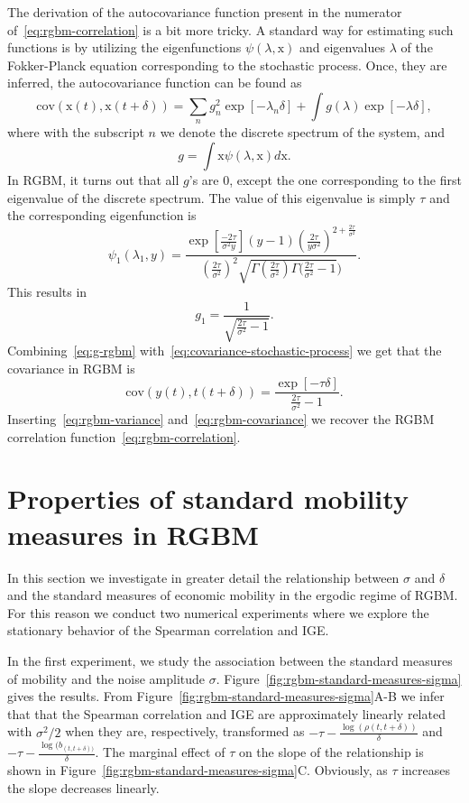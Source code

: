 \documentclass[11pt]{article}
\newcommand{\Fref}[1]{Figure~\ref{fig:#1}}
\newcommand{\be}{\begin{equation}}
\newcommand{\ee}{\end{equation}}
\numberwithin{equation}{section}
\begin{document}
The derivation of the autocovariance function present in the numerator of~\eqref{eq:rgbm-correlation} is a bit more tricky. A standard way for estimating such functions is by utilizing the eigenfunctions $\psi(\lambda,\mathrm{x})$ and eigenvalues $\lambda$ of the Fokker-Planck equation corresponding to the stochastic process. Once, they are inferred, the autocovariance function can be found as
\be
\mathrm{cov}(\mathrm{x}(t), \mathrm{x}(t+\delta)) = \sum_n g_n^2 \exp\left[ -\lambda_n \delta \right] + \int g(\lambda)\exp\left[ -\lambda \delta \right],
\label{eq:covariance-stochastic-process}
\ee
where with the subscript $n$ we denote the discrete spectrum of the system, and
\be
g = \int \mathrm{x} \psi(\lambda,\mathrm{x}) d\mathrm{x}.
\ee
In RGBM, it turns out that all $g$'s are 0, except the one corresponding to the first eigenvalue of the discrete spectrum. The value of this eigenvalue is simply $\tau$ and the corresponding eigenfunction is \citep{LiuSerota2017}
%
\be
\psi_1(\lambda_1,y) = \frac{\exp\left[\frac{-2\tau}{\sigma^2 y}\right](y-1) (\frac{2\tau}{y \sigma^2})^{2+\frac{2\tau}{\sigma^2}}}{(\frac{2\tau}{\sigma^2})^2\sqrt{\Gamma (\frac{2\tau}{\sigma^2}) \Gamma (\frac{2\tau}{\sigma^2}-1})}.
\label{eq:eigenfunction-rgbm}
\ee
This results in
\be
g_1 = \frac{1}{\sqrt{\frac{2\tau}{\sigma^2}-1}}.
\label{eq:g-rgbm}
\ee
Combining~\eqref{eq:g-rgbm} with~\ref{eq:covariance-stochastic-process} we get that the covariance in RGBM is
\be
\mathrm{cov}(y(t), t(t+\delta)) = \frac{\exp\left[-\tau \delta\right]}{\frac{2\tau}{\sigma^2}-1}.
\label{eq:rgbm-covariance}
\ee
Inserting~\eqref{eq:rgbm-variance} and~\eqref{eq:rgbm-covariance} we recover the RGBM correlation function~\eqref{eq:rgbm-correlation}.

\section{Properties of standard mobility measures in RGBM}\label{sec:properties-standard-mobility-measures}

In this section we investigate in greater detail the relationship between $\sigma$ and $\delta$ and the standard measures of economic mobility in the ergodic regime of RGBM. For this reason we conduct two numerical experiments where we explore the stationary behavior of the Spearman correlation and IGE. 

In the first experiment, we study the association between the standard measures of mobility and the noise amplitude $\sigma$. \Fref{rgbm-standard-measures-sigma} gives the results. From \Fref{rgbm-standard-measures-sigma}A-B we infer that that the Spearman correlation and IGE are approximately linearly related with $\sigma^2/2$ when they are, respectively, transformed as $-\tau - \frac{\log(\rho(t,t+\delta))}{\delta}$ and $-\tau - \frac{\log(b_{(t,t+\delta))}}{\delta}$. The marginal effect of $\tau$ on the slope of the relationship is shown in \Fref{rgbm-standard-measures-sigma}C. Obviously, as $\tau$ increases the slope decreases linearly.
\end{document}
